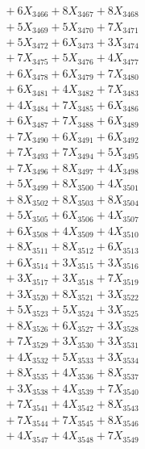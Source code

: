 \documentclass[a4paper,10pt]{article}
\begin{document}
{\begin{align}
&\;  + 6 X_{3466} + 8 X_{3467} + 8 X_{3468} \\[0.3ex]
&\;  + 5 X_{3469} + 5 X_{3470} + 7 X_{3471} \\[0.3ex]
&\;  + 5 X_{3472} + 6 X_{3473} + 3 X_{3474} \\[0.3ex]
&\;  + 7 X_{3475} + 5 X_{3476} + 4 X_{3477} \\[0.3ex]
&\;  + 6 X_{3478} + 6 X_{3479} + 7 X_{3480} \\[0.3ex]
&\;  + 6 X_{3481} + 4 X_{3482} + 7 X_{3483} \\[0.3ex]
&\;  + 4 X_{3484} + 7 X_{3485} + 6 X_{3486} \\[0.3ex]
&\;  + 6 X_{3487} + 7 X_{3488} + 6 X_{3489} \\[0.5ex]\allowbreak
&\;  + 7 X_{3490} + 6 X_{3491} + 6 X_{3492} \\[0.3ex]
&\;  + 7 X_{3493} + 7 X_{3494} + 5 X_{3495} \\[0.3ex]
&\;  + 7 X_{3496} + 8 X_{3497} + 4 X_{3498} \\[0.3ex]
&\;  + 5 X_{3499} + 8 X_{3500} + 4 X_{3501} \\[0.3ex]
&\;  + 8 X_{3502} + 8 X_{3503} + 8 X_{3504} \\[0.3ex]
&\;  + 5 X_{3505} + 6 X_{3506} + 4 X_{3507} \\[0.3ex]
&\;  + 6 X_{3508} + 4 X_{3509} + 4 X_{3510} \\[0.3ex]
&\;  + 8 X_{3511} + 8 X_{3512} + 6 X_{3513} \\[0.3ex]
&\;  + 6 X_{3514} + 3 X_{3515} + 3 X_{3516} \\[0.3ex]
&\;  + 3 X_{3517} + 3 X_{3518} + 7 X_{3519} \\[0.5ex]\allowbreak
&\;  + 3 X_{3520} + 8 X_{3521} + 3 X_{3522} \\[0.3ex]
&\;  + 5 X_{3523} + 5 X_{3524} + 3 X_{3525} \\[0.3ex]
&\;  + 8 X_{3526} + 6 X_{3527} + 3 X_{3528} \\[0.3ex]
&\;  + 7 X_{3529} + 3 X_{3530} + 3 X_{3531} \\[0.3ex]
&\;  + 4 X_{3532} + 5 X_{3533} + 3 X_{3534} \\[0.3ex]
&\;  + 8 X_{3535} + 4 X_{3536} + 8 X_{3537} \\[0.3ex]
&\;  + 3 X_{3538} + 4 X_{3539} + 7 X_{3540} \\[0.3ex]
&\;  + 7 X_{3541} + 4 X_{3542} + 8 X_{3543} \\[0.3ex]
&\;  + 7 X_{3544} + 7 X_{3545} + 8 X_{3546} \\[0.3ex]
&\;  + 4 X_{3547} + 4 X_{3548} + 7 X_{3549} \\[0.5ex]\allowbreak

\end{align}}
\end{document}
